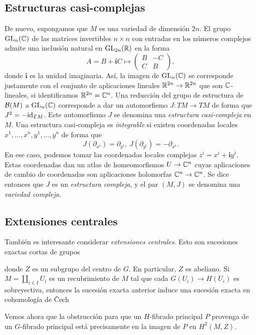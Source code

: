 \documentclass[11pt,a4paper]{amsbook}
\theoremstyle{remark} \newtheorem{rmk}[subsection]{Observación}
\theoremstyle{definition} \newtheorem{defn}[subsection]{Definición}
\theoremstyle{definition} \newtheorem{ex}[subsection]{Ejemplo}
\theoremstyle{definition} \newtheorem{ej}[subsection]{Ejercicio}
\begin{document}
\subsection{Estructuras casi-complejas} De nuevo, supongamos que $M$ es una variedad de dimensión $2n$. El grupo $\operatorname{GL}_{n}(\mathbb C)$ de las matrices invertibles $n\times n$ con entradas en los números complejos admite una inclusión natural en $\operatorname{GL}_{2n}(\mathbb R)$ en la forma
\begin{equation*}
  A=B+\mathbf{i} C \mapsto
  \begin{pmatrix}
    B & -C \\
    C & B
\end{pmatrix},
\end{equation*}
donde $\mathbf{i}$ es la unidad imaginaria.
Así, la imagen de $\operatorname{GL}_n(\mathbb C)$ se corresponde justamente con el conjunto de aplicaciones lineales $\mathbb R^{2n}\rightarrow \mathbb R^{2n}$ que son $\mathbb C$-lineales, si identificamos $\mathbb R^{2n}=\mathbb C^{n}$. Una reducción del grupo de estructura de $\mathcal B(M)$ a $\operatorname{GL}_n(\mathbb C)$ corresponde a dar un automorfismo $J:TM\rightarrow TM$ de forma que $J^2=-\mathrm{id}_{TM}$. Este automorfismo $J$ se denomina una \emph{estructura casi-compleja} en $M$. Una estructura casi-compleja es \emph{integrable} si existen coordenadas locales $x^1,\dots,x^n,y^1,\dots,y^n$ de forma que
\begin{equation*}
J(\partial_{x^i}) = \partial_{y^i},\ J(\partial_{y^i}) = -\partial_{x^i}.
\end{equation*}
En ese caso, podemos tomar las coordenadas locales complejas $z^i=x^i + \mathbf{i} y^i$. Estas coordenadas dan un atlas de homeomorfismos $U\rightarrow \mathbb C^{n}$ cuyas aplicaciones de cambio de coordenadas son aplicaciones holomorfas $\mathbb C^n\rightarrow \mathbb C^n$. Se dice entonces que $J$ es un \emph{estructura compleja}, y el par $(M,J)$ se denomina una \emph{variedad compleja}.

\subsection{Extensiones centrales}
También es interesante considerar \emph{extensiones centrales}. Esto son sucesiones exactas cortas de grupos
\begin{center}
\end{center}
donde $Z$ es un subgrupo del centro de $G$. En particular, $Z$ es abeliano. Si $M=\coprod_{i\in I} U_i$ es un recubrimiento de $M$ tal que cada $G(U_i)\rightarrow H(U_i)$ es sobreyectiva, entonces la sucesión exacta anterior induce una sucesión exacta en cohomología de \v{C}ech
\begin{center}
\end{center}
Vemos ahora que la obstrucción para que un $H$-fibrado principal $P$ provenga de un $G$-fibrado principal está precisamente en la imagen de $P$ en $H^2(M,Z)$.
\end{document}

